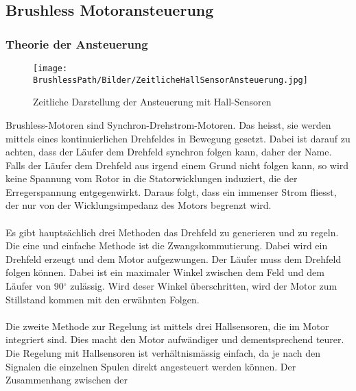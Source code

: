 \subsection{Brushless Motoransteuerung}
    \BLDCcollab
    \subsubsection{Theorie der Ansteuerung}
        \begin{wrapfigure}{r}{0.50\textwidth}
           	\texttt{[image: \\BrushlessPath/Bilder/ZeitlicheHallSensorAnsteuerung.jpg]}
           	\caption[Zeitliche Darstellung der Ansteuerung mit 
                Hall-Sensoren]{Zeitliche Darstellung der Ansteuerung mit 
                Hall-Sensoren \cite{AppNote:BrushlessuC}}
           	\centering
            \label{abb:ZeitlicheAnsteuerungBrushlessMotor}
        \end{wrapfigure}
        Brushless-Motoren sind Synchron-Drehstrom-Motoren. Das heisst, sie 
        werden mittels eines kontinuierlichen Drehfeldes in Bewegung gesetzt. 
        Dabei ist darauf zu achten, dass der Läufer dem Drehfeld synchron 
        folgen kann, daher der Name. Falls der Läufer dem Drehfeld aus irgend 
        einem Grund nicht folgen kann, so wird keine Spannung vom Rotor in die 
        Statorwicklungen induziert, die der Erregerspannung entgegenwirkt. 
        Daraus folgt, dass ein immenser Strom fliesst, der nur von der 
        Wicklungsimpedanz des Motors begrenzt wird.\\
        \\
        Es gibt hauptsächlich drei Methoden das Drehfeld zu generieren und zu 
        regeln. Die eine und einfache Methode ist die Zwangskommutierung. 
        Dabei wird ein Drehfeld erzeugt und dem Motor aufgezwungen. Der Läufer 
        muss dem Drehfeld folgen können. Dabei ist ein maximaler Winkel 
        zwischen dem Feld und dem Läufer von 90$^\circ$ zulässig. Wird deser 
        Winkel überschritten, wird der Motor zum Stillstand kommen mit den 
        erwähnten Folgen.\\
        \\
        Die zweite Methode zur Regelung ist mittels drei Hallsensoren, die im 
        Motor integriert sind. Dies macht den Motor aufwändiger und 
        dementsprechend teurer. Die Regelung mit Hallsensoren ist 
        verhältnismässig einfach, da je nach den Signalen die einzelnen Spulen 
        direkt angesteuert werden können. Der Zusammenhang zwischen der 
